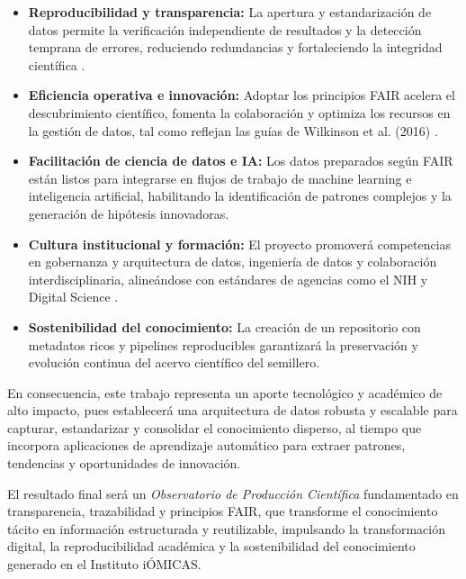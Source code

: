 \begin{itemize}
  \item \textbf{Reproducibilidad y transparencia:}  
    La apertura y estandarización de datos permite la verificación independiente de resultados y la detección temprana de errores, reduciendo redundancias y fortaleciendo la integridad científica \cite{piwowar2013data_reuse}.

  \item \textbf{Eficiencia operativa e innovación:}  
    Adoptar los principios FAIR acelera el descubrimiento científico, fomenta la colaboración y optimiza los recursos en la gestión de datos, tal como reflejan las guías de Wilkinson et al. (2016) \cite{wilkinson2016fair_principles}.

  \item \textbf{Facilitación de ciencia de datos e IA:}  
    Los datos preparados según FAIR están listos para integrarse en flujos de trabajo de machine learning e inteligencia artificial, habilitando la identificación de patrones complejos y la generación de hipótesis innovadoras.

  \item \textbf{Cultura institucional y formación:}  
    El proyecto promoverá competencias en gobernanza y arquitectura de datos, ingeniería de datos y colaboración interdisciplinaria, alineándose con estándares de agencias como el NIH \cite{NIH2023data_sharing} y Digital Science \cite{digital_science2023benefits_fair}.

  \item \textbf{Sostenibilidad del conocimiento:}  
    La creación de un repositorio con metadatos ricos y pipelines reproducibles garantizará la preservación y evolución continua del acervo científico del semillero.
\end{itemize}

En consecuencia, este trabajo representa un aporte tecnológico y académico de alto impacto, pues establecerá una arquitectura de datos robusta y escalable para capturar, estandarizar y consolidar el conocimiento disperso, al tiempo que incorpora aplicaciones de aprendizaje automático para extraer patrones, tendencias y oportunidades de innovación.

El resultado final será un \emph{Observatorio de Producción Científica} fundamentado en transparencia, trazabilidad y principios FAIR, que transforme el conocimiento tácito en información estructurada y reutilizable, impulsando la transformación digital, la reproducibilidad académica y la sostenibilidad del conocimiento generado en el Instituto iÓMICAS.
